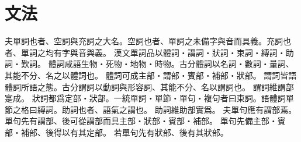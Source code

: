 \chapter*{文法}
夫單詞也者、空詞與充詞之大名。空詞也者、單詞之未備字與音而具義。充詞也者、單詞之均有字與音與義。
漢文單詞品以體詞・謂詞・狀詞・束詞・縛詞・助詞・歎詞。
體詞咸語生物・死物・地物・時物。古分體詞以名詞・數詞・量詞、其能不分、名之以體詞也。
體詞可成主部・謂部・賓部・補部・狀部。
謂詞皆語體詞所語之態。古分謂詞以動詞與形容詞、其能不分、名以謂詞也。
謂詞維謂部寔成。
狀詞都爲定部・狀部。一統單詞・單節・單句・複句者曰束詞。語體詞單節之格曰縛詞。助詞也者、語氣之謂也。
助詞維助部實爲。
夫單句應有謂部焉。
單句先有謂部、後可從謂部而具主部・狀部・賓部・補部。
單句先備主部・賓部・補部、後得以有其定部。
若單句先有狀部、後有其狀部。

